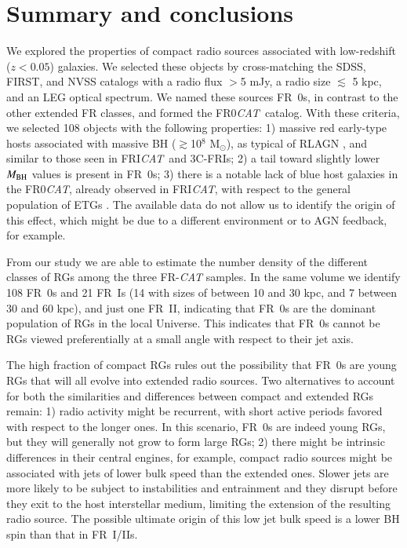 \documentclass[traditabstract]{aa}
\newcommand{\FR}{FRI{\sl{CAT}}}\newcommand{\FRII}{FRII{\sl{CAT}}}
\newcommand{\FRo}{FR0{\sl{CAT}}}
\begin{document}
\section{Summary and conclusions}

We explored the properties of compact radio sources associated with
low-redshift ($z <0.05$) galaxies. We selected these objects by
cross-matching the SDSS, FIRST, and NVSS catalogs with a radio flux
$>$5 mJy, a radio size $\lesssim$ 5 kpc, and an LEG optical
spectrum. We named these sources FR~0s, in contrast to the other
extended FR classes, and formed the \FRo\ catalog. With these
criteria, we selected 108 objects with the following properties: 1)
massive red early-type hosts associated with massive BH
($\gtrsim$10$^{8}$ M$_{\odot}$), as typical of RLAGN
\citep{baldi10b,best12,chiaberge11}, and similar to those seen in \FR\
and 3C-FRIs; 2) a tail toward slightly lower $M_{\rm BH}$ values is
present in FR~0s; 3) there is a notable lack of blue host galaxies in
the \FRo, already observed in \FR, with respect to the general
population of ETGs \citep{schawinski09}. The available data do not
allow us to identify the origin of this effect, which might be due to
a different environment or to AGN feedback, for example.

From our study we are able to estimate the number density of the
different classes of RGs among the three FR-{\it CAT} samples. In the
same volume we identify 108 FR~0s and 21 FR~Is (14 with sizes of
between 10 and 30 kpc, and 7 between 30 and 60 kpc), and just one
FR~II, indicating that FR~0s are the dominant population of RGs in the
local Universe. This indicates that FR~0s cannot be RGs viewed
preferentially at a small angle with respect to their jet axis.

The high fraction of compact RGs rules out the possibility that FR~0s
are young RGs that will all evolve into extended radio sources. Two
alternatives to account for both the similarities and differences
between compact and extended RGs remain: 1) radio activity might be
recurrent, with short active periods favored with respect to the
longer ones. In this scenario, FR~0s are indeed young RGs, but they
will generally not grow to form large RGs; 2) there might be intrinsic
differences in their central engines, for example, compact radio
sources might be associated with jets of lower bulk speed than the
extended ones. Slower jets are more likely to be subject to
instabilities and entrainment and they disrupt before they exit to the
host interstellar medium, limiting the extension of the resulting
radio source. The possible ultimate origin of this low jet bulk speed
is a lower BH spin than that in FR~I/IIs.
\end{document}
